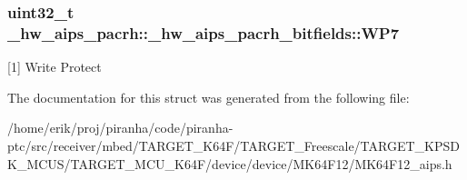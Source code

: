 \subsubsection[{\texorpdfstring{W\+P7}{WP7}}]{\setlength{\rightskip}{0pt plus 5cm}uint32\+\_\+t \+\_\+hw\+\_\+aips\+\_\+pacrh\+::\+\_\+hw\+\_\+aips\+\_\+pacrh\+\_\+bitfields\+::\+W\+P7}\hypertarget{struct__hw__aips__pacrh_1_1__hw__aips__pacrh__bitfields_a1c41ed2030f1bb671aae0614d100864f}{}\label{struct__hw__aips__pacrh_1_1__hw__aips__pacrh__bitfields_a1c41ed2030f1bb671aae0614d100864f}
\mbox{[}1\mbox{]} Write Protect 

The documentation for this struct was generated from the following file\+:\begin{DoxyCompactItemize}
\item 
/home/erik/proj/piranha/code/piranha-\/ptc/src/receiver/mbed/\+T\+A\+R\+G\+E\+T\+\_\+\+K64\+F/\+T\+A\+R\+G\+E\+T\+\_\+\+Freescale/\+T\+A\+R\+G\+E\+T\+\_\+\+K\+P\+S\+D\+K\+\_\+\+M\+C\+U\+S/\+T\+A\+R\+G\+E\+T\+\_\+\+M\+C\+U\+\_\+\+K64\+F/device/device/\+M\+K64\+F12/M\+K64\+F12\+\_\+aips.\+h\end{DoxyCompactItemize}
